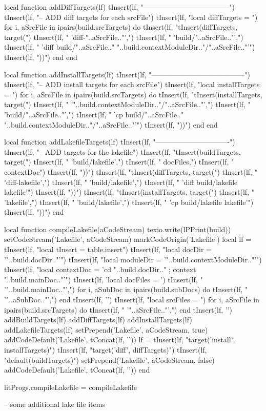 local function addDiffTargets(lf)
  tInsert(lf, "------------------------------------")
  tInsert(lf, "-- ADD diff targets for each srcFile\n")
  tInsert(lf, "local diffTargets = {}\n")
  for i, aSrcFile in ipairs(build.srcTargets) do
    tInsert(lf, "tInsert(diffTargets, target(")
    tInsert(lf, "  'diff-"..aSrcFile.."',")
    tInsert(lf, "  'build/"..aSrcFile.."',")
    tInsert(lf, "  'diff build/"..aSrcFile.." "..build.contextModuleDir.."/"..aSrcFile.."'")
    tInsert(lf, "))\n")
  end
end

local function addInstallTargets(lf)
  tInsert(lf, "---------------------------------------")
  tInsert(lf, "-- ADD install targets for each srcFile\n")
  tInsert(lf, "local installTargets = {}\n")
  for i, aSrcFile in ipairs(build.srcTargets) do
    tInsert(lf, "tInsert(installTargets, target(")
    tInsert(lf, "  '"..build.contextModuleDir.."/"..aSrcFile.."',")
    tInsert(lf, "  'build/"..aSrcFile.."',")
    tInsert(lf, "  'cp build/"..aSrcFile.." "..build.contextModuleDir.."/"..aSrcFile.."'")
    tInsert(lf, "))\n")
  end
end

local function addLakefileTargets(lf)
  tInsert(lf, "-------------------------------")
  tInsert(lf, "-- ADD targets for the lakefile\n")
  tInsert(lf, "tInsert(buildTargets, target(")
  tInsert(lf, "  'build/lakefile',")
  tInsert(lf, "  docFiles,")
  tInsert(lf, "  contextDoc")
  tInsert(lf, "))\n")
  tInsert(lf, "tInsert(diffTargets, target(")
  tInsert(lf, "  'diff-lakefile',")
  tInsert(lf, "  'build/lakefile',")
  tInsert(lf, "  'diff build/lakefile lakefile'")
  tInsert(lf, "))\n")
  tInsert(lf, "tInsert(installTargets, target(")
  tInsert(lf, "  'lakefile',")
  tInsert(lf, "  'build/lakefile',")
  tInsert(lf, " 'cp build/lakefile lakefile'")
  tInsert(lf, "))\n")
end

local function compileLakefile(aCodeStream)
  texio.write(lPPrint(build))
  setCodeStream('Lakefile', aCodeStream)
  markCodeOrigin('Lakefile')
  local lf = {}
  tInsert(lf, "local tInsert    = table.insert\n")
  tInsert(lf, "local docDir     = '"..build.docDir.."'")
  tInsert(lf, "local moduleDir  = '"..build.contextModuleDir.."'\n")
  tInsert(lf, "local contextDoc = 'cd "..build.docDir.." ; context "..build.mainDoc.."'\n")
  tInsert(lf, 'local docFiles = {')
  tInsert(lf, "  '"..build.mainDoc.."',")
  for i, aSubDoc in ipairs(build.subDocs) do
    tInsert(lf, "  '"..aSubDoc.."',")
  end
  tInsert(lf, '}\n')
  tInsert(lf, "local srcFiles = {")
  for i, aSrcFile in ipairs(build.srcTargets) do
    tInsert(lf, "  '"..aSrcFile.."',")
  end
  tInsert(lf, '}\n')
  addBuildTargets(lf)
  addDiffTargets(lf)
  addInstallTargets(lf)
  addLakefileTargets(lf)
  setPrepend('Lakefile', aCodeStream, true)
  addCodeDefault('Lakefile', tConcat(lf, '\n'))
  lf = {}
  tInsert(lf, "target('install', installTargets)")
  tInsert(lf, "target('diff', diffTargets)")
  tInsert(lf, "default(buildTargets)")
  setPrepend('Lakefile', aCodeStream, false)
  addCodeDefault('Lakefile', tConcat(lf, '\n'))
end

litProgs.compileLakefile = compileLakefile
\stopLuaCode

\startLakefile
-- some additional lake file items
\stopLakefile

\stopchapter